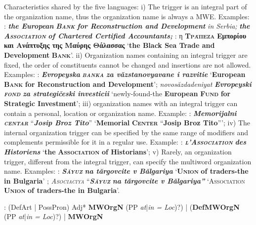 \documentclass[output=paper]{langsci/langscibook}
\newcommand{\trigger}[1]{\textsc{#1}}
\begin{document}
Characteristics shared by the five languages: i) The trigger is an
integral part of the organization name, thus the organization name is
always a MWE. Examples: : \textbf{\textit{the European
}}\textbf{\textit{\trigger{Bank}}} \textbf{\textit{for Reconstruction and
Development }}\textit{in Serbia;} \textbf{\textit{the
}}\textbf{\textit{\trigger{Association}}} \textbf{\textit{of Chartered
Certified Accountants;}} : η
\textbf{\trigger{Τράπεζα}}\textbf{ Εμπορίου και
Ανάπτυξης της Μαύρης Θάλασσας }‘\textbf{the Black Sea Trade and
Development }\textbf{\trigger{Bank}}’. ii) Organization names containing
an integral trigger are fixed, the order of constituents cannot be
changed and insertions are not allowed. Examples: :
\textbf{\textit{Evropeyska }}\textbf{\textit{\trigger{banka}}}
\textbf{\textit{za văzstanovyavane i razvitie}} ‘\textbf{European
}\textbf{\trigger{Bank}} \textbf{for Reconstruction and Development}’;
\textit{novosăzdadeniyat} \textbf{\textit{Evropeyski
}}\textbf{\textit{\trigger{fond}}} \textbf{\textit{za strategičeski
investicii }}‘newly-found-the \textbf{European }\textbf{\trigger{Fund}}
\textbf{for Strategic Investment}'; iii) organization names with an
integral trigger can contain a personal, location or organization name.
Example: : \textbf{\textit{Memorijalni
}}\textbf{\textit{\trigger{centar}}} “\textbf{\textit{Josip Broz Tito}}”
‘\textbf{Memorial }\textbf{\trigger{Center}} “\textbf{Josip Broz Tito}”’;
iv) The internal organization trigger can be specified by the same
range of modifiers and complements permissible for it in a regular use.
Example: : \textbf{\textit{\trigger{l’Association}}}
\textbf{\textit{des Historiens}} ‘\textbf{the
}\textbf{\trigger{Association}} \textbf{of Historians}’; v) Rarely, an
organization trigger, different from the integral trigger, can specify
the multiword organization name. Examples: :
\textbf{\textit{\trigger{Săyuz}}} \textbf{\textit{na tărgovcite v
Bălgariya }}‘\textbf{\trigger{Union}} \textbf{of traders-the in
Bulgaria}’ ; \textit{\trigger{Asociaciya}}
“\textbf{\textit{\trigger{Săyuz}}} \textbf{\textit{na tărgovcite v
Bălgariya” }}‘\trigger{Association} \textbf{\trigger{Union}} \textbf{of
traders-the in Bulgaria}’.



: (DefArt | PossPron) Adj* \textbf{MWOrgN }(PP \textit{at}|\textit{in = Loc})?)
| (\textbf{DefMWOrgN }(PP \textit{at}|\textit{in = Loc})?) | \textbf{MWOrgN}
\end{document}
